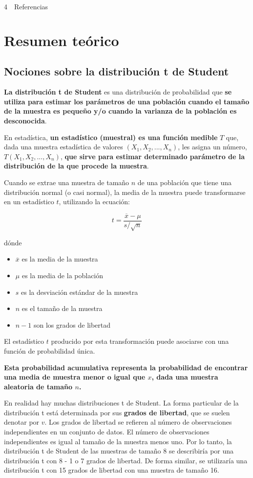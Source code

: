 \documentclass[11pt]{article}
\providecommand{\tightlist}{%
      \setlength{\itemsep}{0pt}\setlength{\parskip}{0pt}}
\begin{document}
{4~~}Referencias

    \section{Resumen teórico}\label{resumen-teuxf3rico}

\subsection{Nociones sobre la distribución t de
Student}\label{nociones-sobre-la-distribuciuxf3n-t-de-student}

\textbf{La distribución t de Student} es una distribución de
probabilidad que \textbf{se utiliza para estimar los parámetros de una
población cuando el tamaño de la muestra es pequeño y/o cuando la
varianza de la población es desconocida}.

En estadística, \textbf{un estadístico (muestral) es una función
medible} \(T\) que, dada una muestra estadística de valores
\((X_1,X_2,...,X_n)\), les asigna un número, \(T(X_1,X_2,...,X_n)\),
\textbf{que sirve para estimar determinado parámetro de la distribución
de la que procede la muestra}.

Cuando se extrae una muestra de tamaño \(n\) de una población que tiene
una distribución normal (o casi normal), la media de la muestra puede
transformarse en un estadístico \(t\), utilizando la ecuación:

\[ t = \frac{ \overline{x} - \mu}{s / \sqrt{n}}  \]

dónde

\begin{itemize}
\tightlist
\item
  \(\overline{x}\) es la media de la muestra
\item
  \(\mu\) es la media de la población
\item
  \(s\) es la desviación estándar de la muestra
\item
  \(n\) es el tamaño de la muestra
\item
  \(n - 1\) son los grados de libertad
\end{itemize}

El estadístico \(t\) producido por esta transformación puede asociarse
con una función de probabilidad única.

\textbf{Esta probabilidad acumulativa representa la probabilidad de
encontrar una media de muestra menor o igual que \(x\), dada una muestra
aleatoria de tamaño \(n\).}

En realidad hay muchas distribuciones t de Student. La forma particular
de la distribución t está determinada por sus \textbf{grados de
libertad}, que se suelen denotar por \(v\). Los grados de libertad se
refieren al número de observaciones independientes en un conjunto de
datos. El número de observaciones independientes es igual al tamaño de
la muestra menos uno. Por lo tanto, la distribución t de Student de las
muestras de tamaño 8 se describiría por una distribución t con 8 - 1 o 7
grados de libertad. De forma similar, se utilizaría una distribución t
con 15 grados de libertad con una muestra de tamaño 16.
\end{document}
